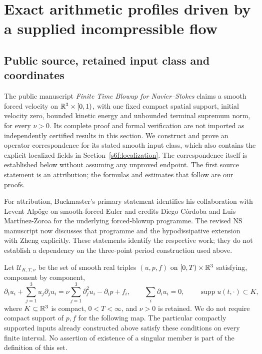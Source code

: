 \section{Exact arithmetic profiles driven by a supplied incompressible flow}
\label{sec:naf}

\subsection{Public source, retained input class and coordinates}

The public manuscript \emph{Finite Time Blowup for Navier--Stokes}
\cite[Theorem 1.1]{openaiNS2026} claims a smooth forced velocity on
$\mathbb R^3\times[0,1)$, with one fixed compact spatial support, initial
velocity zero, bounded kinetic energy and unbounded terminal supremum
norm, for every $\nu>0$. Its complete proof and formal verification are
not imported as independently certified results in this section. We
construct and prove an operator correspondence for its stated smooth
input class, which also contains the explicit localized fields in
Section~\ref{s6f:localization}. The correspondence itself is established
below without assuming any unproved endpoint. The first source statement
is an attribution; the formulas and estimates that follow are our proofs.

For attribution, Buckmaster's primary statement
\cite[p.~1]{buckmasterStatement2026} identifies his collaboration with
Levent Alp\"oge on smooth-forced Euler and credits Diego C\'ordoba and
Luis Mart\'inez-Zoroa for the underlying forced-blowup programme.
The revised NS manuscript \cite[pp.~2--3]{openaiNS2026} now discusses
that programme and the hypodissipative extension with Zheng explicitly.
These statements identify the respective work; they do not establish
a dependency on the three-point period construction used above.

Let $\mathcal U_{K,T,\nu}$ be the set of smooth real triples $(u,p,f)$
on $[0,T)\times\mathbb R^3$ satisfying, component by component,
\begin{equation}
 \partial_tu_i+\sum_{j=1}^3u_j\partial_ju_i
 =\nu\sum_{j=1}^3\partial_j^2u_i-\partial_ip+f_i,
 \qquad \sum_i\partial_i u_i=0,
 \qquad \operatorname{supp}u(t,\cdot)\subset K,
 \label{naf:input}
\end{equation}
where $K\subset\mathbb R^3$ is compact, $0<T<\infty$, and $\nu>0$ is retained.
We do not require compact support of $p,f$ for the following map. The
particular compactly supported inputs already constructed above satisfy
these conditions on every finite interval. No assertion of existence of
a singular member is part of the definition of this set.

